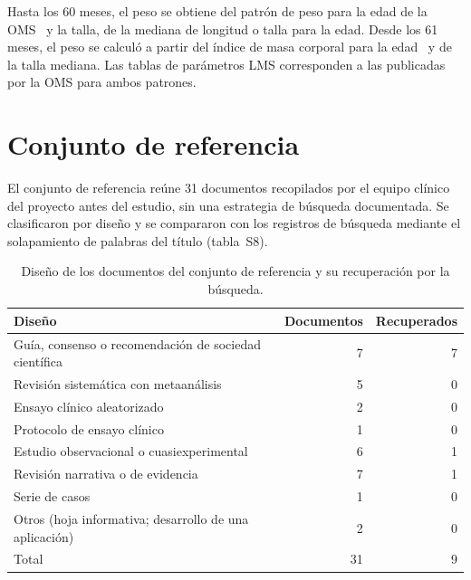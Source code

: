 \documentclass[10pt,a4paper]{article}
\begin{document}
Hasta los 60 meses, el peso se obtiene del patrón de peso para la edad de la OMS~\citep{mgrs2006} y la talla, de la mediana de longitud o talla para la edad. Desde los 61 meses, el peso se calculó a partir del índice de masa corporal para la edad~\citep{deonis2007} y de la talla mediana. Las tablas de parámetros LMS corresponden a las publicadas por la OMS para ambos patrones.

\section{Conjunto de referencia}

El conjunto de referencia reúne 31 documentos recopilados por el equipo clínico del proyecto antes del estudio, sin una estrategia de búsqueda documentada. Se clasificaron por diseño y se compararon con los registros de búsqueda mediante el solapamiento de palabras del título (tabla~S8).

\begin{table}[htbp]
\centering
\caption{Diseño de los documentos del conjunto de referencia y su recuperación por la búsqueda.}
\small
\begin{tabular}{@{}lrr@{}}
\toprule
Diseño & Documentos & Recuperados \\
\midrule
Guía, consenso o recomendación de sociedad científica & 7 & 7 \\
Revisión sistemática con metaanálisis & 5 & 0 \\
Ensayo clínico aleatorizado & 2 & 0 \\
Protocolo de ensayo clínico & 1 & 0 \\
Estudio observacional o cuasiexperimental & 6 & 1 \\
Revisión narrativa o de evidencia & 7 & 1 \\
Serie de casos & 1 & 0 \\
Otros (hoja informativa; desarrollo de una aplicación) & 2 & 0 \\
\midrule
Total & 31 & 9 \\
\bottomrule
\end{tabular}
\end{table}
\end{document}
